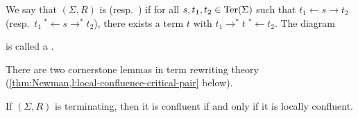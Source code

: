 We say that $(\Sigma,R)$ is  (resp.\ ) if for all $s,t_1,t_2 \in \operatorname{Ter}(\Sigma)$ such that $t_1 \leftarrow s \to t_2$ (resp.\ $t_1 \:{}^*\!\!\leftarrow s \to^* t_2$), there exists a term $t$ with $t_1 \to^* t\; {}^*\!\!\leftarrow t_2$.  
The diagram  
\begin{center}
\end{center}
is called a .

There are two cornerstone lemmas in term rewriting theory (\cref{thm:Newman,l:local-confluence-critical-pair} below).

\begin{lemma}
  \label{thm:Newman}
  If $(\Sigma,R)$ is terminating, then it is confluent if and only if it is locally confluent.
\end{lemma}


